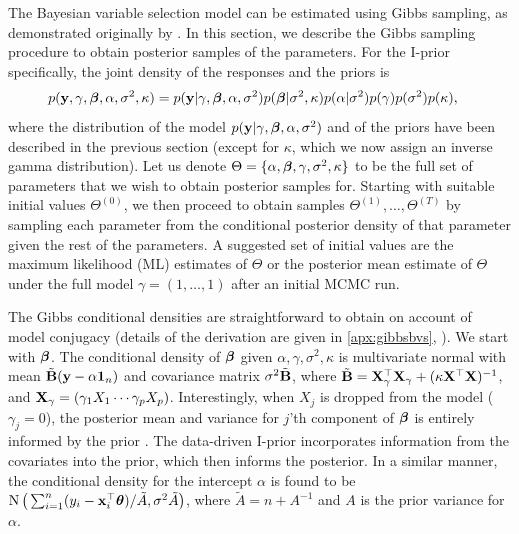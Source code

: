 \documentclass[11pt,twoside,openright]{report}
\begin{document}
The Bayesian variable selection model can be estimated using Gibbs sampling, as demonstrated originally by \citet{Kuo1998}.
In this section, we describe the Gibbs sampling procedure to obtain posterior samples of the parameters.
For the I-prior specifically, the joint density of the responses and the priors is 
\begin{align*}
  p({\mathbf y},\gamma,{\bm\beta},\alpha,\sigma^2,\kappa)
  &= p({\mathbf y}|\gamma,{\bm\beta},\alpha,\sigma^2)p({\bm\beta}|\sigma^2,\kappa)p(\alpha|\sigma^2)p(\gamma)p(\sigma^2)p(\kappa),
\end{align*}
where the distribution of the model $p({\mathbf y}|\gamma,{\bm\beta},\alpha,\sigma^2)$ and of the priors have been described in the previous section (except for $\kappa$, which we now assign an inverse gamma distribution).
Let us denote $\Theta=\{\alpha,{\bm\beta},\gamma,\sigma^2,\kappa\}$ to be the full set of parameters that we wish to obtain posterior samples for.
Starting with suitable initial values $\Theta^{(0)}$, we then proceed to obtain samples $\Theta^{(1)}, \dots, \Theta^{(T)}$ by sampling each parameter from the conditional posterior density of that parameter given the rest of the parameters.
A suggested set of initial values are the maximum likelihood (ML) estimates of $\Theta$ or the posterior mean estimate of $\Theta$ under the full model $\gamma=(1,\dots,1)$ after an initial MCMC run.

The Gibbs conditional densities are straightforward to obtain on account of model conjugacy (details of the derivation are given in \cref{apx:gibbsbvs}, ).
We start with ${\bm\beta}$. 
The conditional density of ${\bm\beta}$ given $\alpha,\gamma,\sigma^2,\kappa$ is multivariate normal with mean $\tilde {{\mathbf B}}({\mathbf y}-\alpha{\mathbf 1}_n)$ and covariance matrix $\sigma^2\tilde {{\mathbf B}}$, where $\tilde {{\mathbf B}} = {\mathbf X}_\gamma^\top {\mathbf X}_\gamma + (\kappa \mathbf X^\top \mathbf X)^{-1}$, and ${\mathbf X}_\gamma = (\gamma_1X_1 \cdots \gamma_pX_p)$.
Interestingly, when $X_j$ is dropped from the model ($\gamma_j=0$), the posterior mean and variance for $j$'th component of ${\bm\beta}$ is entirely informed by the prior \citep{Kuo1998}.
The data-driven I-prior incorporates information from the covariates into the prior, which then informs the posterior.
In a similar manner, the conditional density for the intercept $\alpha$ is found to be $\operatorname{N}\big( \sum_{i=1}^n(y_i - {\mathbf x}_i^\top{\bm\theta}) / \tilde A,\sigma^2\tilde A \big)$, where $\tilde A = n + A^{-1}$ and $A$ is the prior variance for $\alpha$.
\end{document}
